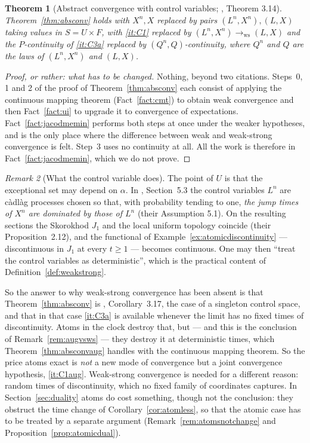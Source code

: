 \documentclass[11pt,a4paper]{article}
\theoremstyle{plain}
\newtheorem{theorem}{Theorem}[section]
\theoremstyle{definition}
\theoremstyle{remark}
\newtheorem{remark}[theorem]{Remark}
\newcommand{\CPS}{\cite{CPS23}}
\begin{document}
\begin{theorem}[Abstract convergence with control variables; \CPS, Theorem 3.14]
  \label{thm:absconvws}
  Theorem~\ref{thm:absconv} holds with $X^n, X$ replaced by pairs
  $(L^n,X^n), (L,X)$ taking values in $S = U \times F$, with \ref{it:C1} replaced
  by $(L^n,X^n) \to_{\mathrm{ws}} (L,X)$ and the $P$-continuity of \ref{it:C3a}
  replaced by $(Q^n,Q)$-continuity, where $Q^n$ and $Q$ are the laws of
  $(L^n,X^n)$ and $(L,X)$.
\end{theorem}

\begin{proof}[Proof, or rather: what has to be changed]
  Nothing, beyond two citations.  Steps~0, 1 and 2 of the proof of
  Theorem~\ref{thm:absconv} each consist of applying the continuous mapping
  theorem (Fact~\ref{fact:cmt}) to obtain weak convergence and then
  Fact~\ref{fact:ui} to upgrade it to convergence of expectations.
  Fact~\ref{fact:jacodmemin} performs both steps at once under the weaker
  hypotheses, and is the only place where the difference between weak and
  weak-strong convergence is felt.  Step~3 uses no continuity at all.  All the
  work is therefore in Fact~\ref{fact:jacodmemin}, which we do not prove.
\end{proof}

\begin{remark}[What the control variable does]
  \label{rem:controlvars}
  The point of $U$ is that the exceptional set may depend on $\alpha$.  In
  \CPS, Section~5.3 the control variables $L^n$ are c\`adl\`ag processes chosen so
  that, with probability tending to one, \emph{the jump times of $X^n$ are
  dominated by those of $L^n$} (their Assumption 5.1).  On the resulting sections
  the Skorokhod $J_1$ and the local uniform topology coincide (their
  Proposition~2.12), and the functional of
  Example~\ref{ex:atomicdiscontinuity} --- discontinuous in $J_1$ at every
  $t \geq 1$ --- becomes continuous.  One may then ``treat the control variables as
  deterministic'', which is the practical content of
  Definition~\ref{def:weakstrong}.

  So the answer to why weak-strong convergence has been absent is that
  Theorem~\ref{thm:absconv} is \CPS, Corollary~3.17, the case of a singleton
  control space, and that in that case \ref{it:C3a} is available whenever the
  limit has no fixed times of discontinuity.  Atoms in the clock destroy that,
  but --- and this is the conclusion of Remark~\ref{rem:augvsws} --- they destroy
  it at deterministic times, which Theorem~\ref{thm:absconvaug} handles with the
  continuous mapping theorem.  So the price atoms exact is \emph{not} a new mode
  of convergence but a joint convergence hypothesis, \ref{it:C1aug}.  Weak-strong
  convergence is needed for a different reason: random times of discontinuity,
  which no fixed family of coordinates captures.  In Section~\ref{sec:duality}
  atoms do cost something, though not the conclusion: they obstruct the
  time change of Corollary~\ref{cor:atomless}, so that the atomic case has to be
  treated by a separate argument (Remark~\ref{rem:atomsnotchange} and
  Proposition~\ref{prop:atomicdual}).
\end{remark}
\end{document}
